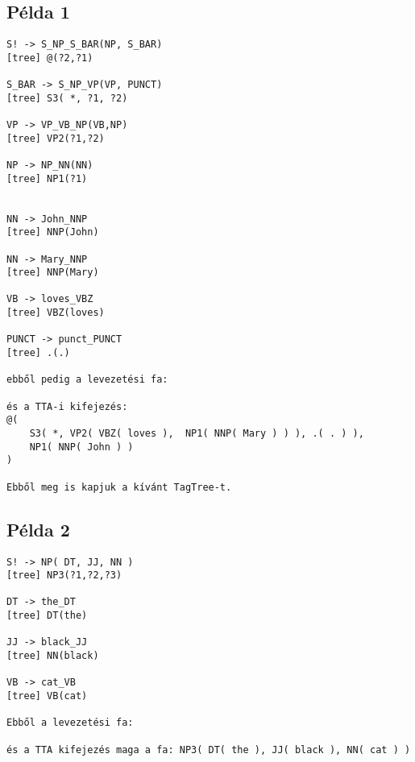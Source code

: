 \appendix
\chapter*{\fuggelek}
\setcounter{chapter}{\appendixnumber}



\section{Példa 1}

\begin{verbatim}
S! -> S_NP_S_BAR(NP, S_BAR)
[tree] @(?2,?1)

S_BAR -> S_NP_VP(VP, PUNCT)
[tree] S3( *, ?1, ?2)

VP -> VP_VB_NP(VB,NP)
[tree] VP2(?1,?2)

NP -> NP_NN(NN)
[tree] NP1(?1)


NN -> John_NNP
[tree] NNP(John)

NN -> Mary_NNP
[tree] NNP(Mary)

VB -> loves_VBZ
[tree] VBZ(loves)

PUNCT -> punct_PUNCT
[tree] .(.)

ebből pedig a levezetési fa:

és a TTA-i kifejezés: 
@(
	S3( *, VP2( VBZ( loves ),  NP1( NNP( Mary ) ) ), .( . ) ), 
	NP1( NNP( John ) ) 
)

Ebből meg is kapjuk a kívánt TagTree-t.
\end{verbatim}



\section{Példa 2}

\begin{verbatim}
S! -> NP( DT, JJ, NN )
[tree] NP3(?1,?2,?3)

DT -> the_DT
[tree] DT(the)

JJ -> black_JJ
[tree] NN(black)

VB -> cat_VB
[tree] VB(cat)

Ebből a levezetési fa:

és a TTA kifejezés maga a fa: NP3( DT( the ), JJ( black ), NN( cat ) )

\end{verbatim}



